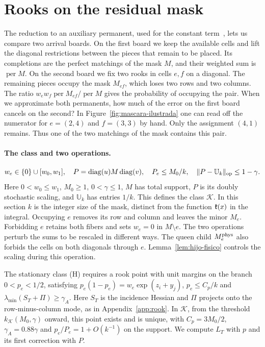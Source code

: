 \section{Rooks on the residual mask}\label{sec:torres}
\label{sec:rook} The reduction to an auxiliary permanent, used for the constant term~\cite{tc},
lets us compare two arrival boards. On the first board we keep the available cells and lift the
diagonal restrictions between the pieces that remain to be placed. Its completions are the perfect
matchings of the mask $M$, and their weighted sum is $\operatorname{per}M$. On the second board we
fix two rooks in cells $e,f$ on a diagonal. The remaining pieces occupy the mask $M_{ef}$, which
loses two rows and two columns. The ratio $w_ew_f\operatorname{per}M_{ef}/\operatorname{per}M$
gives the probability of occupying the pair. When we approximate both permanents, how much of the
error on the first board cancels on the second? In Figure~\ref{fig:mascara-ilustrada} one can read
off the numerator for $e=(2,4)$ and $f=(3,3)$ by hand. Only the assignment $(4,1)$ remains. Thus
one of the two matchings of the mask contains this pair.

\paragraph{The class and two operations.}
\[
  w_e\in\{0\}\cup[w_0,w_1],\quad P=\operatorname{diag}(u)M\operatorname{diag}(v),
  \quad P_e\le M_0/k,\quad \|P-\mathbb U_k\|_{\rm op}\le1-\gamma .
\]
Here $0<w_0\le w_1$, $M_0\ge1$, $0<\gamma\le1$, $M$ has total support, $P$ is its doubly
stochastic scaling, and $\mathbb U_k$ has entries $1/k$. This defines the class $\mathcal K$. In
this section $k$ is the integer size of the mask, distinct from the function $\mathfrak{k}(x)$ in the
integral. Occupying $e$ removes its row and column and leaves the minor $M_e$. Forbidding $e$
retains both fibers and sets $w_e=0$ in $M\setminus e$. The two operations perturb the sums to be
rescaled in different ways. The queen child $M_e^{\rm phys}$ also forbids the cells on both
diagonals through $e$. Lemma~\ref{lem:hijo-fisico} controls the scaling during this operation.

The stationary class (H) requires a rook point with unit margins on the branch $0<p_e<1/2$,
satisfying $p_e(1-p_e)=w_e\exp(z_i+y_j)$, $p_e\le C_p/k$ and $\lambda_{\min}(S_T+\Pi)\ge\gamma_A$.
Here $S_T$ is the incidence Hessian and $\Pi$ projects onto the row-minus-column mode, as in
Appendix~\ref{app:rook}. In $\mathcal K$, from the threshold $k_{\mathcal K}(M_0,\gamma)$ onward,
this point exists and is unique, with $C_p=3M_0/2$, $\gamma_A=0.88\gamma$ and
$p_e/P_e=1+O(k^{-1})$ on the support. We compute $L_T$ with $p$ and its first correction with $P$.

